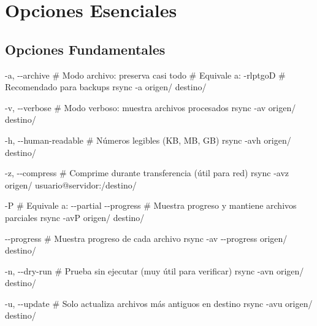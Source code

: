 \documentclass[
  doc,
  floatsintext,
  longtable,
  a4paper,
  nolmodern,
  notxfonts,
  notimes,
  12pt,
  colorlinks=true,linkcolor=blue,citecolor=blue,urlcolor=blue]{apa7}
\newenvironment{Shaded}{\begin{snugshade}}{\end{snugshade}}
\newcommand{\AttributeTok}[1]{\textcolor[rgb]{0.40,0.45,0.13}{#1}}
\newcommand{\CommentTok}[1]{\textcolor[rgb]{0.37,0.37,0.37}{#1}}
\newcommand{\ExtensionTok}[1]{\textcolor[rgb]{0.00,0.23,0.31}{#1}}
\newcommand{\FunctionTok}[1]{\textcolor[rgb]{0.28,0.35,0.67}{#1}}
\newcommand{\NormalTok}[1]{\textcolor[rgb]{0.00,0.23,0.31}{#1}}
\begin{document}
\section{Opciones Esenciales}\label{opciones-esenciales}

\subsection{Opciones Fundamentales}\label{opciones-fundamentales}

\begin{Shaded}
\begin{Highlighting}[]
\ExtensionTok{{-}a,} \AttributeTok{{-}{-}archive}
    \CommentTok{\# Modo archivo: preserva casi todo}
    \CommentTok{\# Equivale a: {-}rlptgoD}
    \CommentTok{\# Recomendado para backups}
    \FunctionTok{rsync} \AttributeTok{{-}a}\NormalTok{ origen/ destino/}

\ExtensionTok{{-}v,} \AttributeTok{{-}{-}verbose}
    \CommentTok{\# Modo verboso: muestra archivos procesados}
    \FunctionTok{rsync} \AttributeTok{{-}av}\NormalTok{ origen/ destino/}

\ExtensionTok{{-}h,} \AttributeTok{{-}{-}human{-}readable}
    \CommentTok{\# Números legibles (KB, MB, GB)}
    \FunctionTok{rsync} \AttributeTok{{-}avh}\NormalTok{ origen/ destino/}

\ExtensionTok{{-}z,} \AttributeTok{{-}{-}compress}
    \CommentTok{\# Comprime durante transferencia (útil para red)}
    \FunctionTok{rsync} \AttributeTok{{-}avz}\NormalTok{ origen/ usuario@servidor:/destino/}

\ExtensionTok{{-}P}
    \CommentTok{\# Equivale a: {-}{-}partial {-}{-}progress}
    \CommentTok{\# Muestra progreso y mantiene archivos parciales}
    \FunctionTok{rsync} \AttributeTok{{-}avP}\NormalTok{ origen/ destino/}

\ExtensionTok{{-}{-}progress}
    \CommentTok{\# Muestra progreso de cada archivo}
    \FunctionTok{rsync} \AttributeTok{{-}av} \AttributeTok{{-}{-}progress}\NormalTok{ origen/ destino/}

\ExtensionTok{{-}n,} \AttributeTok{{-}{-}dry{-}run}
    \CommentTok{\# Prueba sin ejecutar (muy útil para verificar)}
    \FunctionTok{rsync} \AttributeTok{{-}avn}\NormalTok{ origen/ destino/}

\ExtensionTok{{-}u,} \AttributeTok{{-}{-}update}
    \CommentTok{\# Solo actualiza archivos más antiguos en destino}
    \FunctionTok{rsync} \AttributeTok{{-}avu}\NormalTok{ origen/ destino/}


\end{Highlighting}
\end{Shaded}
\end{document}
